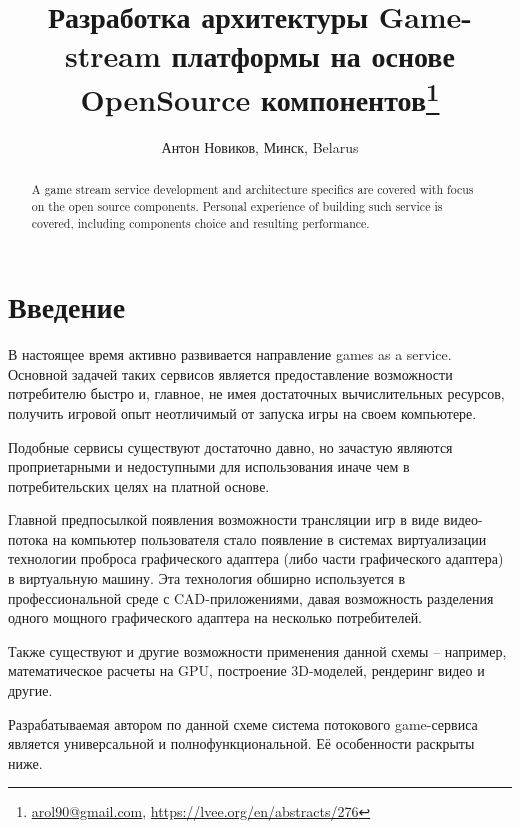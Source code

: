 \documentclass[10pt, a5paper]{article}
\begin{document}
\title{Разработка архитектуры Game-stream платформы на основе OpenSource компонентов\footnote{\url{arol90@gmail.com}, \url{https://lvee.org/en/abstracts/276}}}
\author{Антон Новиков, Минск, Belarus}
\maketitle
\begin{abstract}
A game stream service development and architecture specifics are covered with focus on the open source components. Personal experience of building such service is covered, including compo\-nents choice and resulting performance.
\end{abstract}
\section*{Введение}

В настоящее время активно развивается направление games as a service. Основной задачей таких сервисов является предоставление возможности потребителю быстро и, главное, не имея достаточных вычислительных ресурсов, получить игровой опыт неотличимый от запуска игры на своем компьютере.

Подобные сервисы существуют достаточно давно, но зачастую являются проприетарными и недоступными для использования иначе чем в потребительских целях на платной основе.


Главной предпосылкой появления возможности трансляции игр в виде видео-потока на компьютер пользователя стало появление в системах виртуализации технологии проброса графического адаптера (либо части графического адаптера) в виртуальную машину. Эта технология обширно используется в профессиональной среде с CAD-приложениями, давая возможность разделения одного мощного графического адаптера на несколько потребителей.

Также существуют и другие возможности применения данной схемы – например, математическое расчеты на GPU, построение 3D-моделей, рендеринг видео и другие.

Разрабатываемая автором по данной схеме система потокового game-сервиса является универсальной и полнофункциональной. Её особенности раскрыты ниже.
\end{document}
